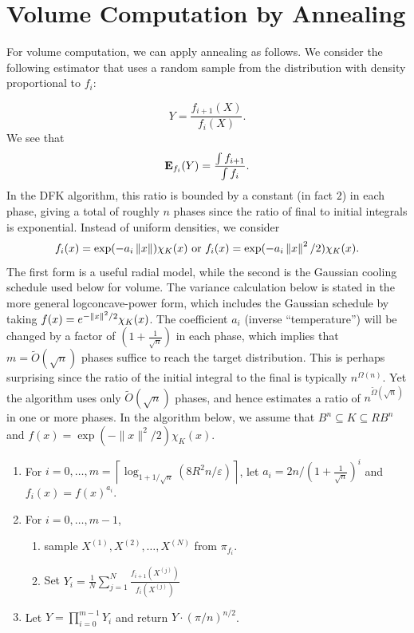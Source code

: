 %

\section{Volume Computation by Annealing}

For volume computation, we can apply annealing as follows. We consider
the following estimator that uses a random sample from the distribution
with density proportional to $f_{i}$:

\[
Y=\frac{f_{i+1}(X)}{f_{i}(X)}.
\]
We see that 
\[
\mathbf{E}_{f_{i}}(Y)=\frac{\int f_{i+1}}{\int f_{i}}.
\]
In the DFK algorithm, this ratio is bounded by a constant (in fact
$2$) in each phase, giving a total of roughly $n$ phases since the
ratio of final to initial integrals is exponential. Instead of uniform
densities, we consider 
\[
f_{i}(x)=\exp(-a_{i}\left\Vert x\right\Vert)\chi_{K}(x)\mbox{ or }f_{i}(x)=\exp(-a_{i}\left\Vert x\right\Vert^{2}/2)\chi_{K}(x).
\]
The first form is a useful radial model, while the second is the Gaussian
cooling schedule used below for volume. The variance calculation below
is stated in the more general logconcave-power form, which includes
the Gaussian schedule by taking $f(x)=e^{-\left\Vert x\right\Vert^{2}/2}\chi_{K}(x)$.
The coefficient $a_{i}$ (inverse ``temperature'') will be changed
by a factor of $(1+\frac{1}{\sqrt{n}})$ in each phase, which implies
that $m=\widetilde{O}(\sqrt{n})$ phases suffice to reach the target
distribution. This is perhaps surprising since the ratio of the initial
integral to the final is typically $n^{\Omega(n)}$. Yet the algorithm
uses only $\widetilde{O}(\sqrt{n})$ phases, and hence estimates a
ratio of $n^{\tilde{\Omega}(\sqrt{n})}$ in one or more phases. In
the algorithm below, we assume that $B^{n}\subseteq K\subseteq RB^{n}$
and $f(x)=\exp(-\|x\|^{2}/2)\chi_{K}(x).$

\begin{algorithm2e}[H]

\caption{$\mathtt{LV\ Volume}$}

\SetAlgoLined
\begin{enumerate}
\item For $i=0,\ldots,m=\left\lceil \log_{1+1/\sqrt{n}}(8R^{2}n/\varepsilon)\right\rceil $,
let $a_{i}=2n/(1+\frac{1}{\sqrt{n}})^{i}$ and $f_{i}(x)=f(x)^{a_{i}}.$
\item For $i=0,\ldots,m-1$, 
\begin{enumerate}
\item sample $X^{(1)},X^{(2)},\ldots,X^{(N)}$ from $\pi_{f_{i}}$.
\item Set $Y_{i}=\frac{1}{N}\sum^{N}_{j=1}\frac{f_{i+1}(X^{(j)})}{f_{i}(X^{(j)})}$ 
\end{enumerate}
\item Let $Y=\prod^{m-1}_{i=0}Y_{i}$ and return $Y\cdot(\pi/n)^{n/2}$.
\end{enumerate}
\end{algorithm2e}


